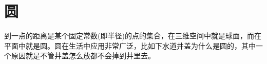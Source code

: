 
\chapter{圆}
\label{chap:circle}

到一点的距离是某个固定常数(即半径)的点的集合，在三维空间中就是球面，而在平面中就是圆。圆在生活中应用非常广泛，比如下水道井盖为什么是圆的，其中一个原因就是不管井盖怎么放都不会掉到井里去。

